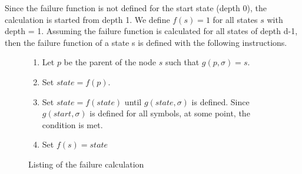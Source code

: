 \documentclass[english,twoside,censored,csm,algorithms-track-2020]{HYthesisML}
\theoremstyle{plain}
\theoremstyle{definition}
\begin{document}
  Since the failure function is not defined for the start state (depth 0), the calculation is started
  from depth 1. We define $f(s)=1$ for all states $s$ with depth = 1. Assuming the failure function is
  calculated for all states of depth d-1, then the failure function of a state s is defined with the
  following instructions.
  
  \begin{figure}[h]
  \begin{enumerate}
  \item Let $p$ be the parent of the node $s$ such that $g(p,\sigma) = s$.
  \item Set $state = f(p)$.
  \item Set $state = f(state)$ until $g(state,\sigma)$ is defined. Since $g(start,\sigma)$ is defined
    for all symbols, at some point, the condition is met.
  \item Set $f(s) = state$
  \end{enumerate}
   \caption{Listing of the failure calculation} \label{lst-failure-calculation}    
  \end{figure}
\end{document}
